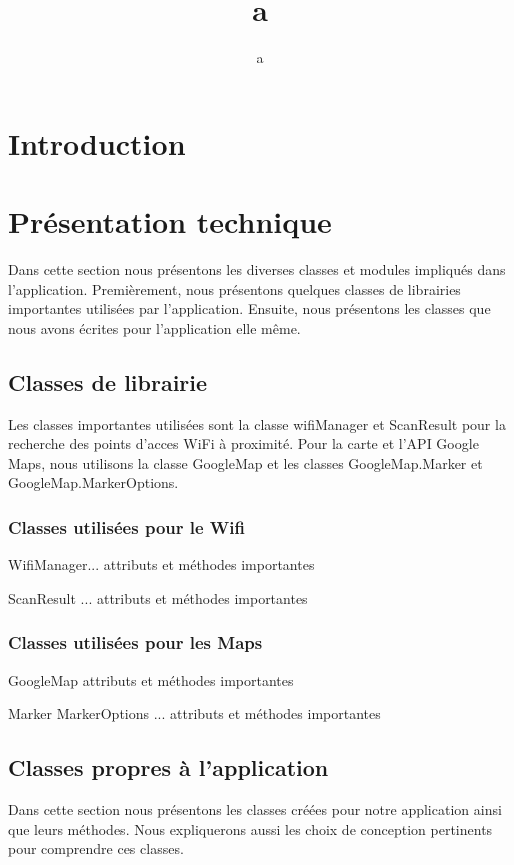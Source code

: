 \documentclass[12pt]{article}
\author{a}
\title{a}
\begin{document}

\setcounter{page}{1}

\tableofcontents

\section{Introduction}

\section{Présentation technique}

Dans cette section nous présentons les diverses classes et modules impliqués
dans l'application.  Premièrement, nous présentons quelques classes de
librairies importantes utilisées par l'application.  Ensuite, nous présentons
les classes que nous avons écrites pour l'application elle même.

\subsection{Classes de librairie}

Les classes importantes utilisées sont la classe wifiManager et ScanResult pour
la recherche des points d'acces WiFi à proximité.  Pour la carte et l'API Google
Maps, nous utilisons la classe GoogleMap et les classes GoogleMap.Marker et
GoogleMap.MarkerOptions.

\subsubsection{Classes utilisées pour le Wifi}

WifiManager... attributs et méthodes importantes

ScanResult ... attributs et méthodes importantes

\subsubsection{Classes utilisées pour les Maps}

GoogleMap attributs et méthodes importantes

Marker MarkerOptions ... attributs et méthodes importantes

\subsection{Classes propres à l'application}

Dans cette section nous présentons les classes créées pour notre application
ainsi que leurs méthodes.  Nous expliquerons aussi les choix de conception
pertinents pour comprendre ces classes.
\end{document}
